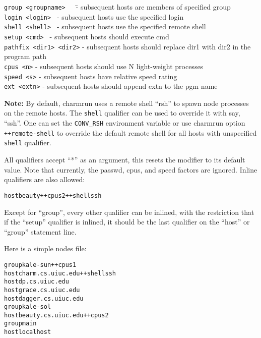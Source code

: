 \begin{tabbing}
{\tt group <groupname>}~~~\= - subsequent hosts are members of specified group\\
{\tt login <login>  }     \> - subsequent hosts use the specified login\\
{\tt shell <shell>  }     \> - subsequent hosts use the specified remote 
shell\\
{\tt setup <cmd>  }       \> - subsequent hosts should execute cmd\\
{\tt pathfix <dir1> <dir2>}         \> - subsequent hosts should replace dir1 with dir2 in the program path\\
{\tt cpus <n>}            \> - subsequent hosts should use N light-weight processes\\
{\tt speed <s>}           \> - subsequent hosts have relative speed rating\\
{\tt ext <extn>}          \> - subsequent hosts should append extn to the pgm name\\
\end{tabbing}

{\bf Note:}
By default, charmrun uses a remote shell ``rsh'' to spawn node processes
on the remote hosts. The {\tt shell} qualifier can be used to override
it with say, ``ssh''. One can set the {\tt CONV\_RSH} environment variable
or use charmrun option {\tt ++remote-shell} to override the default remote 
shell for all hosts with unspecified {\tt shell} qualifier.

All qualifiers accept ``*'' as an argument, this resets the modifier to
its default value.  Note that currently, the passwd, cpus, and speed
factors are ignored.  Inline qualifiers are also allowed:

\begin{alltt}
host beauty ++cpus 2 ++shell ssh
\end{alltt}

Except for ``group'', every other qualifier can be inlined, with the
restriction that if the ``setup'' qualifier is inlined, it should be
the last qualifier on the ``host'' or ``group'' statement line.

Here is a simple nodes file:

\begin{alltt}
        group kale-sun ++cpus 1
          host charm.cs.uiuc.edu ++shell ssh
          host dp.cs.uiuc.edu
          host grace.cs.uiuc.edu
          host dagger.cs.uiuc.edu
        group kale-sol
          host beauty.cs.uiuc.edu ++cpus 2
        group main
          host localhost
\end{alltt}

